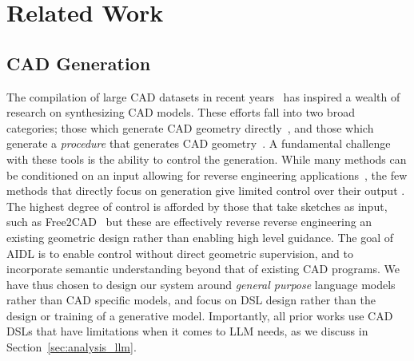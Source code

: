 \section{Related Work}

\subsection{CAD Generation}
The compilation of large CAD datasets in recent years~\citep{koch_abc_2019,willis_fusion_2021,jones_automate_2021,willis_joinable_2022} has inspired a wealth of research on synthesizing CAD models. These efforts fall into two broad categories; those which generate CAD geometry directly~\citep{willis_engineering_2021,guo_complexgen_2022,jayaraman_solidgen_2023,nash_polygen_2020,xu2024brepgen,liu2024point2cad}, and those which generate a \emph{procedure} that generates CAD geometry~\citep{wu_deepcad_2021,ellis_learning_2017, ellis_learning_2018, ganin_computer-aided_2021,ren_extrudenet_2022,li_secad-net_2023,xu_skexgen_2022,lambourne_reconstructing_2022,para_sketchgen_2021, seff_vitruvion_2022,willis_fusion_2021,ma2024draw,li2024sfmcad,khan2024cad}. A fundamental challenge with these tools is the ability to control the generation. While many methods can be conditioned on an input allowing for reverse engineering applications~\citep{lambourne_reconstructing_2022,guo_complexgen_2022}, the few methods that directly focus on generation give limited control over their output \citep{jayaraman_solidgen_2023, wu2021deepcad,xu2024brepgen,seff_vitruvion_2022}. The highest degree of control is afforded by those that take sketches as input, such as Free2CAD~\citep{li_free2cad_2022} but these are effectively reverse reverse engineering an existing geometric design rather than enabling high level guidance. The goal of AIDL is to enable control without direct geometric supervision, and to incorporate semantic understanding beyond that of existing CAD programs. We have thus chosen to design our system around \textit{general purpose} language models rather than CAD specific models, and focus on DSL design rather than the design or training of a generative model. Importantly, all prior works use CAD DSLs that have limitations when it comes to LLM needs, as we discuss in Section~\ref{sec:analysis_llm}.


